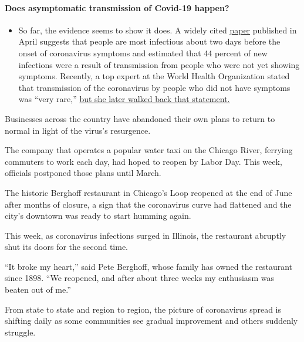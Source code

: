 \begin{itemize}
{  \paragraph{Does asymptomatic transmission of Covid-19
  happen?}\label{does-asymptomatic-transmission-of-covid-19-happen}}

  \begin{itemize}
  \tightlist
  \item
    So far, the evidence seems to show it does. A widely cited
    \href{https://www.nature.com/articles/s41591-020-0869-5}{paper}
    published in April suggests that people are most infectious about
    two days before the onset of coronavirus symptoms and estimated that
    44 percent of new infections were a result of transmission from
    people who were not yet showing symptoms. Recently, a top expert at
    the World Health Organization stated that transmission of the
    coronavirus by people who did not have symptoms was ``very rare,''
    \href{https://www.nytimes.com/2020/06/09/world/coronavirus-updates.html?action=click\&pgtype=Article\&state=default\&region=MAIN_CONTENT_3\&context=storylines_faq\#link-1f302e21}{but
    she later walked back that statement.}
  \end{itemize}
\end{itemize}

Businesses across the country have abandoned their own plans to return
to normal in light of the virus's resurgence.

The company that operates a popular water taxi on the Chicago River,
ferrying commuters to work each day, had hoped to reopen by Labor Day.
This week, officials postponed those plans until March.

The historic Berghoff restaurant in Chicago's Loop reopened at the end
of June after months of closure, a sign that the coronavirus curve had
flattened and the city's downtown was ready to start humming again.

This week, as coronavirus infections surged in Illinois, the restaurant
abruptly shut its doors for the second time.

``It broke my heart,'' said Pete Berghoff, whose family has owned the
restaurant since 1898. ``We reopened, and after about three weeks my
enthusiasm was beaten out of me.''

From state to state and region to region, the picture of coronavirus
spread is shifting daily as some communities see gradual improvement and
others suddenly struggle.

